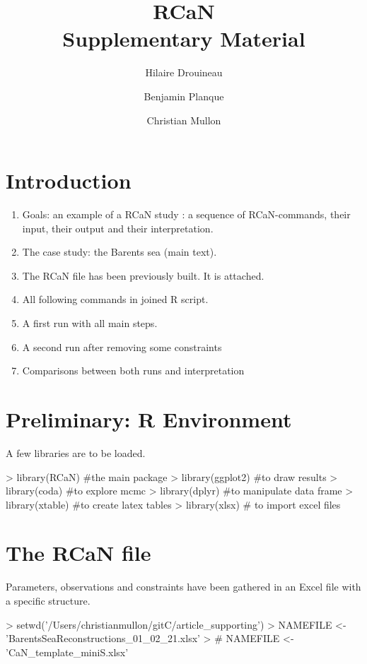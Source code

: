 \documentclass{article}
\title{ \bf{RCaN \\ \vspace{1cm} Supplementary Material \vspace{1cm}} }
\author[1]{Hilaire Drouineau}
\affil[1]{INRAE, Bordeaux, France}
\author[2]{Benjamin Planque}
\affil[2]{HI, Tromsoe, Norway}
\author[3]{Christian Mullon}
\affil[3]{IRD, MARBEC, Sete, France}
\begin{document}



\maketitle

\section{Introduction}
\begin{enumerate}
\item Goals: an example of a RCaN study : a sequence of RCaN-commands, their input, their output and their interpretation.
\item The case study: the Barents sea (main text).
\item The RCaN file has been previously built. It is attached.
\item All following commands in joined R script.
\item A first run with all main steps.
\item A second run after removing some constraints
\item Comparisons between both runs and interpretation
\end{enumerate}
\section{Preliminary: R Environment}
A few libraries are to be loaded.

\begin{Schunk}
\begin{Sinput}
> library(RCaN) #the main package
> library(ggplot2) #to draw results
> library(coda) #to explore mcmc 
> library(dplyr) #to manipulate data frame
> library(xtable) #to create latex tables
> library(xlsx) # to import excel files
\end{Sinput}
\end{Schunk}

\clearpage

\section{The RCaN file}
Parameters, observations and constraints have been gathered in an Excel file with a specific structure. 

\begin{Schunk}
\begin{Sinput}
> setwd('/Users/christianmullon/gitC/article_supporting')
> NAMEFILE <- 'BarentsSeaReconstructions_01_02_21.xlsx'
> # NAMEFILE <- 'CaN_template_miniS.xlsx'
\end{Sinput}
\end{Schunk}
\end{document}
